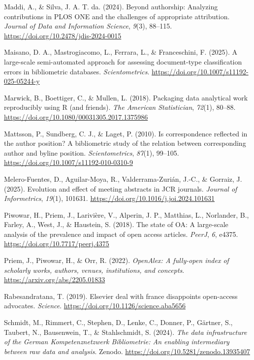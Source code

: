 \documentclass[a4paper,man,floatsintext,longtable,noextraspace,10pt]{apa6}
\newlength{\cslhangindent}
\newenvironment{CSLReferences}[2] %
{\begin{list}{}{%
  \setlength{\itemindent}{0pt}
  \setlength{\leftmargin}{0pt}
  \setlength{\parsep}{0pt}
  \ifodd #1
  \setlength{\leftmargin}{\cslhangindent}
  \setlength{\itemindent}{-1\cslhangindent}
  \fi
  \setlength{\itemsep}{#2\baselineskip}}}
{\end{list}}
\begin{document}
\begin{CSLReferences}{1}{0}
Maddi, A., \& Silva, J. A. T. da. (2024). Beyond authorship: Analyzing
contributions in PLOS ONE and the challenges of appropriate attribution.
\emph{Journal of Data and Information Science}, \emph{9}(3), 88--115.
\url{https://doi.org/10.2478/jdis-2024-0015}

Maisano, D. A., Mastrogiacomo, L., Ferrara, L., \& Franceschini, F.
(2025). A large-scale semi-automated approach for assessing
document-type classification errors in bibliometric databases.
\emph{Scientometrics}. \url{https://doi.org/10.1007/s11192-025-05244-y}

Marwick, B., Boettiger, C., \& Mullen, L. (2018). Packaging data
analytical work reproducibly using {R} (and friends). \emph{The American
Statistician}, \emph{72}(1), 80--88.
\url{https://doi.org/10.1080/00031305.2017.1375986}

Mattsson, P., Sundberg, C. J., \& Laget, P. (2010). Is correspondence
reflected in the author position? A bibliometric study of the relation
between corresponding author and byline position. \emph{Scientometrics},
\emph{87}(1), 99--105. \url{https://doi.org/10.1007/s11192-010-0310-9}

Melero-Fuentes, D., Aguilar-Moya, R., Valderrama-Zurián, J.-C., \&
Gorraiz, J. (2025). Evolution and effect of meeting abstracts in JCR
journals. \emph{Journal of Informetrics}, \emph{19}(1), 101631.
\url{https://doi.org/10.1016/j.joi.2024.101631}

Piwowar, H., Priem, J., Larivière, V., Alperin, J. P., Matthias, L.,
Norlander, B., Farley, A., West, J., \& Haustein, S. (2018). The state
of {OA}: A large-scale analysis of the prevalence and impact of open
access articles. \emph{{PeerJ}}, \emph{6}, e4375.
\url{https://doi.org/10.7717/peerj.4375}

Priem, J., Piwowar, H., \& Orr, R. (2022). \emph{OpenAlex: A fully-open
index of scholarly works, authors, venues, institutions, and concepts}.
\url{https://arxiv.org/abs/2205.01833}

Rabesandratana, T. (2019). Elsevier deal with france disappoints
open-access advocates. \emph{Science}.
\url{https://doi.org/10.1126/science.aba5656}

Schmidt, M., Rimmert, C., Stephen, D., Lenke, C., Donner, P., Gärtner,
S., Taubert, N., Bausenwein, T., \& Stahlschmidt, S. (2024). \emph{The
data infrastructure of the {German Kompetenznetzwerk Bibliometrie}: An
enabling intermediary between raw data and analysis}. Zenodo.
\url{https://doi.org/10.5281/zenodo.13935407}


\end{CSLReferences}
\end{document}
